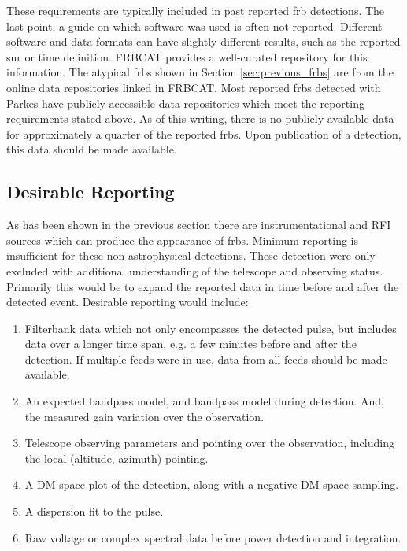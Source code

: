 \documentclass[a4paper,fleqn,usenatbib]{mnras}
\begin{document}
These requirements are typically included in past reported \gls{frb} detections.
The last point, a guide on which software was used is often not reported.
Different software and data formats can have slightly different results, such as
the reported \gls{snr} or time definition.  FRBCAT \citep{2016PASA...33...45P}
provides a well-curated repository for this information. The atypical
\glspl{frb} shown in Section \ref{sec:previous_frbs} are from the online data
repositories linked in FRBCAT. Most reported \glspl{frb} detected with Parkes
have publicly accessible data repositories which meet the reporting requirements
stated above. As of this writing, there is no publicly available data for
approximately a quarter of the reported \glspl{frb}. Upon publication of a
detection, this data should be made available.

\subsection{Desirable Reporting}

As has been shown in the previous section there are instrumentational and RFI
sources which can produce the appearance of \glspl{frb}. Minimum reporting is
insufficient for these non-astrophysical detections. These detection were only
excluded with additional understanding of the telescope and observing status.
Primarily this would be to expand the reported data in time before and after the
detected event. Desirable reporting would include:

\begin{enumerate}
    \item Filterbank data which not only encompasses the detected pulse, but
    includes data over a longer time span, e.g. a few minutes before and after
    the detection. If multiple feeds were in use, data from all feeds should be
    made available.
    \item An expected bandpass model, and bandpass model during detection. And,
    the measured gain variation over the observation.
    \item Telescope observing parameters and pointing over the observation,
    including the local (altitude, azimuth) pointing.
    \item A DM-space plot of the detection, along with a negative DM-space
    sampling.
    \item A dispersion fit to the pulse.
    \item Raw voltage or complex spectral data before power detection and
    integration.
\end{enumerate}
\end{document}
